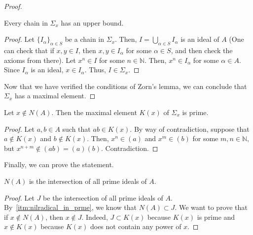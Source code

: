 \begin{problem}
\begin{enumerate}[label=(\theproblem.\arabic*),ref=\theproblem.\arabic*]
\begin{sol}
\begin{claim}
\begin{proof}
                        \begin{claim}
                            Every chain in $\varSigma_x$ has an upper bound.
                            \begin{proof}
                                Let $\{I_{\alpha}\}_{\alpha \in S}$ be a chain in $\varSigma_x$.
                                Then, $I = \bigcup_{\alpha \in S} I_{\alpha}$ is an ideal of $A$ (One can check that if $x,y \in I$, then $x,y \in I_{\alpha} $ for some $\alpha \in S$, and then check the axioms from there).
                                Let $x^n \in I$ for some $n \in \mathbb{N}$.
                                Then, $x^n \in I_{\alpha}$ for some $\alpha \in A$.
                                Since $I_{\alpha}$ is an ideal, $x \in I_{\alpha}$.
                                Thus, $I \in \varSigma_x$.
                            \end{proof}
                        \end{claim}

                        Now that we have verified the conditions of Zorn's lemma, we can conclude that $\varSigma_x$ has a maximal element.
                    \end{proof}
                \end{claim}

                \begin{claim}
                    Let $x \notin N(A)$.
                    Then the maximal element $K(x)$ of $\varSigma_x$ is prime.
                    \begin{proof}
                        Let $a,b \in A$ such that $ab \in K(x)$.
                        By way of contradiction, suppose that $a \notin K(x)$ and $b \notin K(x)$.
                        Then, $x^n \in (a)$ and $x^m \in (b)$ for some $m,n \in \mathbb{N}$, but $x^{n+m} \notin (ab) = (a)(b)$.
                        Contradiction.
                    \end{proof}
                \end{claim}

                Finally, we can prove the statement.

                \begin{claim} $N(A)$ is the intersection of all prime ideals of $A$.
                    \begin{proof}
                        Let $J$ be the intersection of all prime ideals of $A$.
                        By~\ref{itm:nilradical_in_prme}, we know that $N(A) \subset J$.
                        We want to prove that if  $x \notin N(A)$, then $x \notin J$.
                        Indeed, $J \subset K(x)$ because $K(x)$ is prime and $x \notin K(x)$ because $K(x)$ does not contain any power of $x$.
                    \end{proof}
                \end{claim}

            \end{sol}
    \end{enumerate}
\end{problem}

